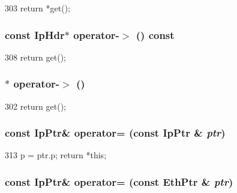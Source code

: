 \begin{DoxyCode}
303 { return *get(); }
\end{DoxyCode}
\hypertarget{classNet_1_1IpPtr_a900bb7613ccda315763fa19c10202f94}{
\subsubsection[{operator-\/$>$}]{\setlength{\rightskip}{0pt plus 5cm}const {\bf IpHdr}$\ast$ operator-\/$>$ () const}}
\label{classNet_1_1IpPtr_a900bb7613ccda315763fa19c10202f94}



\begin{DoxyCode}
308 { return get(); }
\end{DoxyCode}
\hypertarget{classNet_1_1IpPtr_a7091b007cde47df0c303a0c1dd10fa01}{
\subsubsection[{operator-\/$>$}]{$\ast$ operator-\/$>$ ()}}
\label{classNet_1_1IpPtr_a7091b007cde47df0c303a0c1dd10fa01}



\begin{DoxyCode}
302 { return get(); }
\end{DoxyCode}
\hypertarget{classNet_1_1IpPtr_a292e63bcdaae09f0b23fc198ca8fcac1}{
\subsubsection[{operator=}]{\setlength{\rightskip}{0pt plus 5cm}const {\bf IpPtr}\& operator= (const {\bf IpPtr} \& {\em ptr})}}
\label{classNet_1_1IpPtr_a292e63bcdaae09f0b23fc198ca8fcac1}



\begin{DoxyCode}
313 { p = ptr.p; return *this; }
\end{DoxyCode}
\hypertarget{classNet_1_1IpPtr_ac147460b6f6c5c20d843d221874da926}{
\subsubsection[{operator=}]{\setlength{\rightskip}{0pt plus 5cm}const {\bf IpPtr}\& operator= (const {\bf EthPtr} \& {\em ptr})}}
\label{classNet_1_1IpPtr_ac147460b6f6c5c20d843d221874da926}



